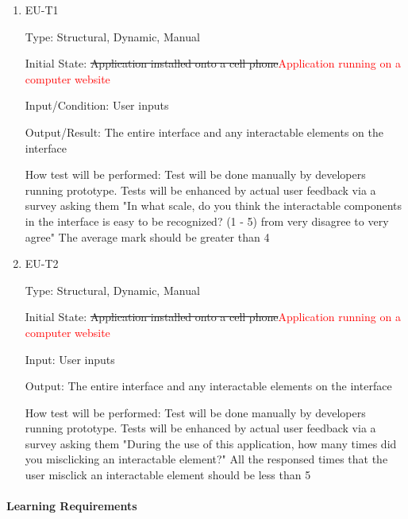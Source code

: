 \documentclass[12pt, titlepage]{article}
\begin{document}
\begin{enumerate}

\item{EU-T1\\}

Type: Structural, Dynamic, Manual
					
Initial State: \sout{Application installed onto a cell phone}\textcolor{red}{Application running on a computer website}
					
Input/Condition: User inputs
					
Output/Result: The entire interface and any interactable elements on the interface
					
How test will be performed: Test will be done manually by developers running prototype. Tests will be enhanced by actual user feedback via a survey asking them "In what scale, do you think the interactable components in the interface is easy to be recognized? (1 - 5) from very disagree to very agree" The average mark should be greater than 4
					
\item{EU-T2\\}

Type: Structural, Dynamic, Manual
					
Initial State: \sout{Application installed onto a cell phone}\textcolor{red}{Application running on a computer website}
					
Input: User inputs
					
Output: The entire interface and any interactable elements on the interface
					
How test will be performed: Test will be done manually by developers running prototype. Tests will be enhanced by actual user feedback via a survey asking them "During the use of this application, how many times did you misclicking an interactable element?" All the responsed times that the user misclick an interactable element should be less than 5

\end{enumerate}

\paragraph{Learning Requirements}
\end{document}
